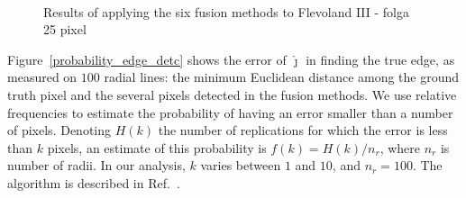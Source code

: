 \documentclass[journal]{IEEEtran}
\begin{document}
\begin{figure}[hbt]
{     }\\
     \caption{Results of applying the six fusion methods to Flevoland III - folga 25 pixel}
     \label{fusion_sf_met}
\end{figure}


Figure~\ref{probability_edge_detc} shows the error of $\widehat\jmath$ in finding the true edge, as measured on $100$ radial lines: the minimum Euclidean distance among the ground truth pixel and the several pixels detected in the fusion methods.
We use relative frequencies to estimate the probability of having an error smaller than a number of pixels. 
Denoting $H(k)$ the number of replications for which the error is less than $k$ pixels, an estimate of this probability is $f(k)={H(k)}/{n_r}$, where $n_r$ is number of radii. 
In our analysis, $k$ varies between $1$ and $10$, and $n_r=100$. 
The algorithm is described in Ref.~\cite{fbgm}.
\end{document}
